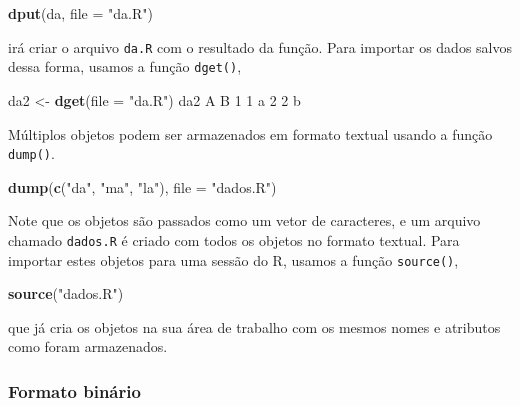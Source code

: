 \documentclass[10pt,a4paper]{book}
\newenvironment{Shaded}{\begin{snugshade}}{\end{snugshade}}
\newcommand{\KeywordTok}[1]{\textcolor[rgb]{0.13,0.29,0.53}{\textbf{#1}}}
\newcommand{\DataTypeTok}[1]{\textcolor[rgb]{0.13,0.29,0.53}{#1}}
\newcommand{\DecValTok}[1]{\textcolor[rgb]{0.00,0.00,0.81}{#1}}
\newcommand{\StringTok}[1]{\textcolor[rgb]{0.31,0.60,0.02}{#1}}
\newcommand{\NormalTok}[1]{#1}
\begin{document}
\begin{Shaded}
\begin{Highlighting}[]
\KeywordTok{dput}\NormalTok{(da, }\DataTypeTok{file =} \StringTok{"da.R"}\NormalTok{)}
\end{Highlighting}
\end{Shaded}

irá criar o arquivo \texttt{da.R} com o resultado da função. Para
importar os dados salvos dessa forma, usamos a função \texttt{dget()},

\begin{Shaded}
\begin{Highlighting}[]
\NormalTok{da2 <-}\StringTok{ }\KeywordTok{dget}\NormalTok{(}\DataTypeTok{file =} \StringTok{"da.R"}\NormalTok{)}
\NormalTok{da2}
\NormalTok{  A B}
\DecValTok{1} \DecValTok{1}\NormalTok{ a}
\DecValTok{2} \DecValTok{2}\NormalTok{ b}
\end{Highlighting}
\end{Shaded}

Múltiplos objetos podem ser armazenados em formato textual usando a
função \texttt{dump()}.

\begin{Shaded}
\begin{Highlighting}[]
\KeywordTok{dump}\NormalTok{(}\KeywordTok{c}\NormalTok{(}\StringTok{"da"}\NormalTok{, }\StringTok{"ma"}\NormalTok{, }\StringTok{"la"}\NormalTok{), }\DataTypeTok{file =} \StringTok{"dados.R"}\NormalTok{)}
\end{Highlighting}
\end{Shaded}

Note que os objetos são passados como um vetor de caracteres, e um
arquivo chamado \texttt{dados.R} é criado com todos os objetos no
formato textual. Para importar estes objetos para uma sessão do R,
usamos a função \texttt{source()},

\begin{Shaded}
\begin{Highlighting}[]
\KeywordTok{source}\NormalTok{(}\StringTok{"dados.R"}\NormalTok{)}
\end{Highlighting}
\end{Shaded}

que já cria os objetos na sua área de trabalho com os mesmos nomes e
atributos como foram armazenados.

\subsubsection{Formato binário}\label{formato-binario}
\end{document}
